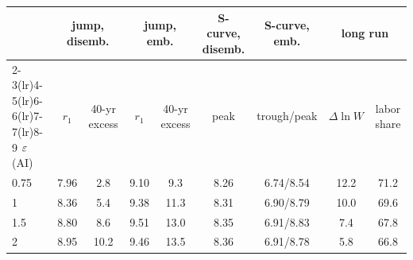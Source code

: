 \begin{tabular}{lcccccccc}\toprule
 & \multicolumn{2}{c}{jump, disemb.} & \multicolumn{2}{c}{jump, emb.} & S-curve, disemb. & S-curve, emb. & \multicolumn{2}{c}{long run}\\
\cmidrule(lr){2-3}\cmidrule(lr){4-5}\cmidrule(lr){6-6}\cmidrule(lr){7-7}\cmidrule(lr){8-9}
$\varepsilon$ (AI) & $r_1$ & 40-yr excess & $r_1$ & 40-yr excess & peak & trough/peak & $\Delta\ln W$ & labor share\\\midrule
0.75 & 7.96 & 2.8 & 9.10 & 9.3 & 8.26 & 6.74/8.54 & 12.2 & 71.2\\
1 & 8.36 & 5.4 & 9.38 & 11.3 & 8.31 & 6.90/8.79 & 10.0 & 69.6\\
1.5 & 8.80 & 8.6 & 9.51 & 13.0 & 8.35 & 6.91/8.83 & 7.4 & 67.8\\
2 & 8.95 & 10.2 & 9.46 & 13.5 & 8.36 & 6.91/8.78 & 5.8 & 66.8\\
\bottomrule\end{tabular}

